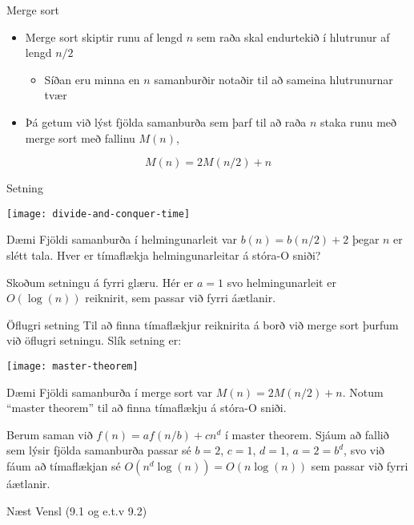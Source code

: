 \documentclass[handout]{beamer}
\begin{document}
\begin{frame}{Merge sort}
\begin{itemize}
 \item Merge sort skiptir runu af lengd $n$ sem raða skal endurtekið í hlutrunur af lengd $n/2$
 \begin{itemize}
  \item Síðan eru minna en $n$ samanburðir notaðir til að sameina hlutrunurnar tvær
 \end{itemize}
 \item Þá getum við lýst fjölda samanburða sem þarf til að raða $n$ staka runu með merge sort með fallinu $M(n)$,
\end{itemize}
\[
 M(n) = 2M(n/2) + n
\]
\end{frame}

\begin{frame}{Setning}
\begin{center}
\texttt{[image: divide-and-conquer-time]}
\end{center}
\end{frame}

\begin{frame}{Dæmi}
Fjöldi samanburða í helmingunarleit var $b(n) = b(n/2) + 2$ þegar $n$ er slétt tala. Hver er tímaflækja helmingunarleitar á stóra-O sniði? \pause

\vspace{1cm}
Skoðum setningu á fyrri glæru. Hér er $a=1$ svo helmingunarleit er $O(\log(n))$ reiknirit, sem passar við fyrri áætlanir.
\end{frame}

\begin{frame}{Öflugri setning}
Til að finna tímaflækjur reiknirita á borð við merge sort þurfum við öflugri setningu. Slík setning er:

\begin{center}
\texttt{[image: master-theorem]}
\end{center}
\end{frame}

\begin{frame}{Dæmi}
Fjöldi samanburða í merge sort var $M(n) = 2M(n/2) + n$. Notum ``master theorem'' til að finna tímaflækju á stóra-O sniði.

\vspace{1cm}
Berum saman við $f(n) = af(n/b) + cn^d$ í master theorem. Sjáum að fallið sem lýsir fjölda samanburða passar sé $b=2$, $c=1$, $d=1$, $a=2=b^d$, svo við fáum að tímaflækjan sé $O(n^d\log (n)) = O(n\log(n))$ sem passar við fyrri áætlanir.
\end{frame}

\begin{frame}{Næst}
Vensl (9.1 og e.t.v 9.2)
\end{frame}
\end{document}
